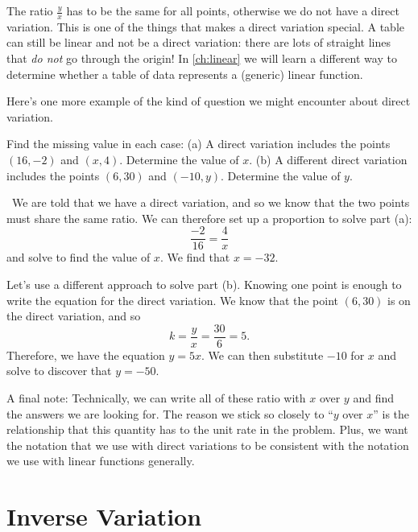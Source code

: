 The ratio $\frac{y}{x}$ has to be the same for all points, otherwise we do not have a direct variation. This is one of the things that makes a direct variation special. A table can still be linear and not be a direct variation: there are lots of straight lines that \textit{do not} go through the origin! In \cref{ch:linear} we will learn a different way to determine whether a table of data represents a (generic) linear function.

Here's one more example of the kind of question we might encounter about direct variation.

\begin{boxedex}
Find the missing value in each case: (a) A direct variation includes the points $(16, -2)$ and $(x, 4)$. Determine the value of $x$. (b) A different direct variation includes the points $(6, 30)$ and $(-10, y)$. Determine the value of $y$.

\exsoln\ We are told that we have a direct variation, and so we know that the two points must share the same ratio. We can therefore set up a proportion to solve part (a):
\[\frac{-2}{16} = \frac{4}{x}\] and solve to find the value of $x$. We find that $x=-32$.

Let's use a different approach to solve part (b). Knowing one point is enough to write the equation for the direct variation. We know that the point $(6,30)$ is on the direct variation, and so \[k = \frac{y}{x} = \frac{30}{6} = 5.\] Therefore, we have the equation $y = 5x$. We can then substitute $-10$ for $x$ and solve to discover that $y=-50$.
\end{boxedex}

A final note: Technically, we can write all of these ratio with $x$ over $y$ and find the answers we are looking for. The reason we stick so closely to ``$y$ over $x$'' is the relationship that this quantity has to the unit rate in the problem. Plus, we want the notation that we use with direct variations to be consistent with the notation we use with linear functions generally.


\section{Inverse Variation}
\label{sec:inversevar}

\begin{boxedexplore}
\end{boxedexplore}

